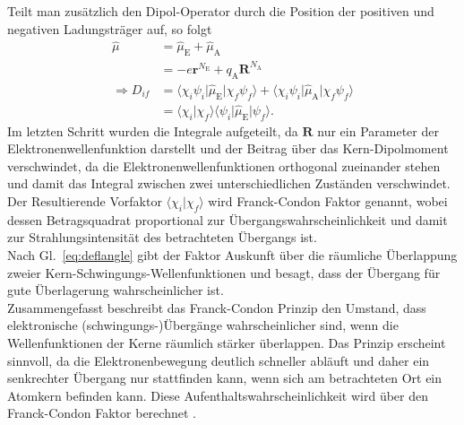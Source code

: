 Teilt man zusätzlich den Dipol-Operator durch die Position der positiven und negativen Ladungsträger auf, 
so folgt 
\begin{align}
    \hat{\mu} &= \hat{\mu}_{\text{E}} + \hat{\mu}_{\text{A}} \\
    &= -e\mathbf{r}^{N_{\text{E}}} + q_{\text{A}}\mathbf{R}^{N_{\text{A}}} \\
    \Rightarrow D_{if} &= \langle\chi_{i}\psi_{i}\vert \hat{\mu}_{\text{E}} \vert\chi_{f}\psi_{f}\rangle + 
    \langle\chi_{i}\psi_{i}\vert \hat{\mu}_{\text{A}} \vert\chi_{f}\psi_{f}\rangle \\
    &= \langle\chi_{i}\vert \chi_{f}\rangle \langle \psi_{i}\vert \hat{\mu}_{\text{E}}\vert\psi_{f}\rangle.
\end{align} 
Im letzten Schritt wurden die Integrale aufgeteilt, da $\mathbf{R}$ nur ein Parameter der Elektronenwellenfunktion 
darstellt und der Beitrag über das Kern-Dipolmoment verschwindet, da die Elektronenwellenfunktionen
orthogonal zueinander stehen und damit das Integral zwischen zwei unterschiedlichen Zuständen verschwindet. \\
Der Resultierende Vorfaktor $\langle\chi_{i}\vert \chi_{f}\rangle$ wird Franck-Condon Faktor genannt, 
wobei dessen Betragsquadrat proportional zur Übergangswahrscheinlichkeit und damit zur Strahlungsintensität 
des betrachteten Übergangs ist. \\
Nach Gl.~\eqref{eq:deflangle} gibt der Faktor Auskunft über die räumliche Überlappung zweier Kern-Schwingungs-Wellenfunktionen
und besagt, dass der Übergang für gute Überlagerung wahrscheinlicher ist. \\ 
Zusammengefasst beschreibt das Franck-Condon Prinzip den Umstand, dass elektronische (schwingungs-)Übergänge 
wahrscheinlicher sind, wenn die Wellenfunktionen der Kerne räumlich stärker überlappen. Das Prinzip erscheint sinnvoll, 
da die Elektronenbewegung deutlich schneller abläuft und daher ein senkrechter Übergang nur stattfinden kann, 
wenn sich am betrachteten Ort ein Atomkern befinden kann. Diese Aufenthaltswahrscheinlichkeit wird über den 
Franck-Condon Faktor berechnet \cite{EPC,Demtroder,Parson}. \\ 